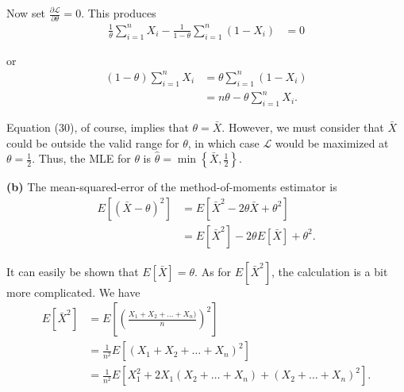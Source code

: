 \documentclass{article}
\begin{document}
\noindent Now set $\frac{\partial\mathscr{L}}{\partial \theta} = 0$.  This produces
\begin{align}
\frac{1}{\theta}\sum\limits_{i=1}^nX_i -\frac{1}{1-\theta}\sum\limits_{i=1}^n(1-X_i) &= 0
\end{align}

\noindent or 
\begin{align}
(1-\theta) \sum\limits_{i=1}^nX_i &= \theta\sum\limits_{i=1}^n(1-X_i) \\
&= n\theta - \theta\sum\limits_{i=1}^nX_i.
\end{align}

\noindent Equation (30), of course, implies that $\theta = \bar{X}$.  However, we must consider that $\bar{X}$ could be outside the valid range for $\theta$, in which case $\mathscr{L}$ would be maximized at $\theta = \frac{1}{2}$.  Thus, the MLE for $\theta$ is $\hat{\theta} = \min\left\lbrace \bar{X}, \frac{1}{2} \right\rbrace.$

\vspace{5mm}

\noindent \textbf{(b)} The mean-squared-error of the method-of-moments estimator is
\begin{align}
E[(\bar{X}-\theta)^2] &= E[\bar{X}^2 - 2\theta\bar{X} + \theta^2] \\
&= E[\bar{X}^2] -2\theta E[\bar{X}] + \theta^2.
\end{align}

\noindent It can easily be shown that $E[\bar{X}] = \theta$.  As for $E[\bar{X}^2]$, the calculation is a bit more complicated. We have
\begin{align}
E[\bar{X}^2] &= E\left[ \left(\frac{X_1 + X_2 + \ldots + X_n)}{n}\right)^2\right] \\
&= \frac{1}{n^2} E[(X_1+X_2+\ldots +X_n)^2] \\
&= \frac{1}{n^2}E[X_1^2 + 2X_1(X_2+\ldots+ X_n) + (X_2 + \ldots + X_n)^2].
\end{align}
\end{document}
